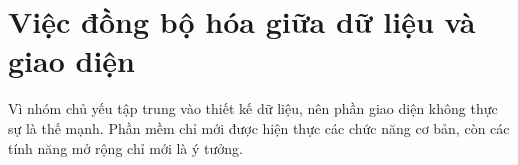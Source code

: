 \documentclass[12pt,a4paper]{report}
\begin{document}
    \section{Việc đồng bộ hóa giữa dữ liệu và giao diện}
    Vì nhóm chủ yếu tập trung vào thiết kế dữ liệu, nên phần giao diện không thực sự là thế mạnh. Phần mềm chỉ mới được hiện thực các chức năng cơ bản, còn các tính năng mở rộng chỉ mới là ý tưởng.
\end{document}
